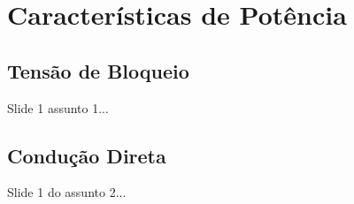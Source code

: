 \section{Características de Potência}

\subsection{Tensão de Bloqueio}

\begin{frame}

    Slide 1 assunto 1...

\end{frame}

\subsection{Condução Direta}

\begin{frame}

    Slide 1 do assunto 2...

\end{frame}
